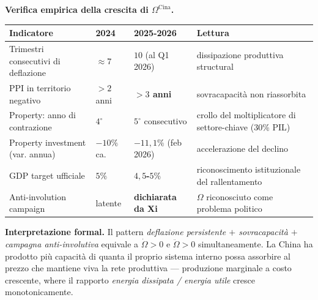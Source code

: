 \Proved{} \textbf{Verifica empirica della crescita di
\(\Omega^{\text{Cina}}\).}

{\def\LTcaptype{none} %
{\small\begin{longtable}[]{@{}
  >{\raggedright\arraybackslash}p{}
  >{\raggedright\arraybackslash}p{}
  >{\raggedright\arraybackslash}p{}
  >{\raggedright\arraybackslash}p{}@{}}
\toprule\noalign{}
\begin{minipage}[b]{\linewidth}\raggedright
Indicatore
\end{minipage} & \begin{minipage}[b]{\linewidth}\raggedright
2024
\end{minipage} & \begin{minipage}[b]{\linewidth}\raggedright
2025-2026
\end{minipage} & \begin{minipage}[b]{\linewidth}\raggedright
Lettura
\end{minipage} \\
\midrule\noalign{}
\endhead
\bottomrule\noalign{}
\endlastfoot
Trimestri consecutivi di deflazione & \(\approx 7\) & \textbf{\(10\)}
(al Q1 2026) & dissipazione produttiva structural \\
PPI in territorio negativo & \(> 2\) anni & \textbf{\(> 3\) anni} &
sovracapacità non riassorbita \\
Property: anno di contrazione & \(4^\circ\) & \textbf{\(5^\circ\)} consecutivo &
crollo del moltiplicatore di settore-chiave (30\% PIL) \\
Property investment (var. annua) & \(-10\%\) ca. &
\textbf{\(-11{,}1\%\)} (feb 2026) & accelerazione del declino \\
GDP target ufficiale & \(5\%\) & \textbf{\(4{,}5\)-\(5\%\)} &
riconoscimento istituzionale del rallentamento \\
Anti-involution campaign & latente & \textbf{dichiarata da Xi} &
\(\Omega\) riconosciuto come problema politico \\
\end{longtable}}
}

\Hypoth{} \textbf{Interpretazione formal.} Il pattern \emph{deflazione
persistente \(+\) sovracapacità \(+\) campagna anti-involutiva} equivale
a \(\dot\Omega > 0\) e \(\ddot\Omega > 0\) simultaneamente. La China ha
prodotto più capacità di quanta il proprio sistema interno possa
assorbire al prezzo che mantiene viva la rete produttiva --- produzione
marginale a costo crescente, where il rapporto \emph{energia dissipata /
energia utile} cresce monotonicamente.

